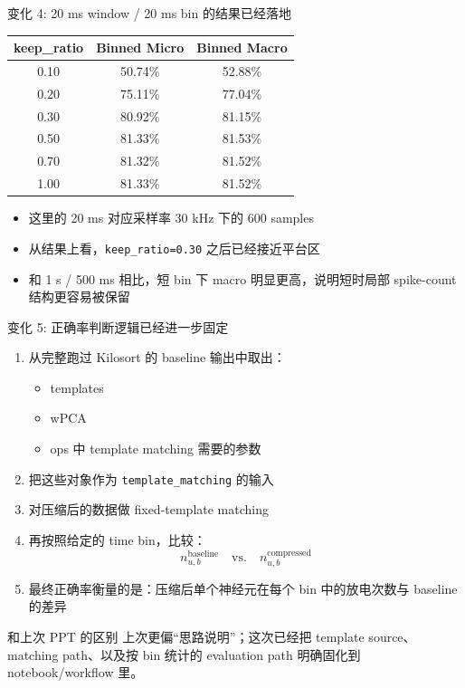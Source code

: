 \documentclass[aspectratio=169,11pt]{beamer}
\begin{document}
\begin{frame}{变化 4: 20 ms window / 20 ms bin 的结果已经落地}
  \small
  \begin{table}
    \centering
    \begin{tabular}{ccc}
      \toprule
      keep\_ratio & Binned Micro & Binned Macro \\
      \midrule
      0.10 & 50.74\% & 52.88\% \\
      0.20 & 75.11\% & 77.04\% \\
      0.30 & 80.92\% & 81.15\% \\
      0.50 & 81.33\% & 81.53\% \\
      0.70 & 81.32\% & 81.52\% \\
      1.00 & 81.33\% & 81.52\% \\
      \bottomrule
    \end{tabular}
  \end{table}

  \vspace{0.4em}
  \begin{itemize}
    \item 这里的 20 ms 对应采样率 30 kHz 下的 600 samples
    \item 从结果上看，\texttt{keep\_ratio=0.30} 之后已经接近平台区
    \item 和 1 s / 500 ms 相比，短 bin 下 macro 明显更高，说明短时局部 spike-count 结构更容易被保留
  \end{itemize}
\end{frame}

\begin{frame}{变化 5: 正确率判断逻辑已经进一步固定}
  \small
  \begin{enumerate}
    \item 从完整跑过 Kilosort 的 baseline 输出中取出：
    \begin{itemize}
      \item templates
      \item wPCA
      \item ops 中 template matching 需要的参数
    \end{itemize}
    \item 把这些对象作为 \texttt{template\_matching} 的输入
    \item 对压缩后的数据做 fixed-template matching
    \item 再按照给定的 time bin，比较：
    \[
      n^{\text{baseline}}_{u,b} \quad \text{vs.} \quad n^{\text{compressed}}_{u,b}
    \]
    \item 最终正确率衡量的是：\alert{压缩后单个神经元在每个 bin 中的放电次数与 baseline 的差异}
  \end{enumerate}

  \begin{block}{和上次 PPT 的区别}
    上次更偏“思路说明”；这次已经把 template source、matching path、以及按 bin 统计的 evaluation path 明确固化到 notebook/workflow 里。
  \end{block}
\end{frame}
\end{document}
